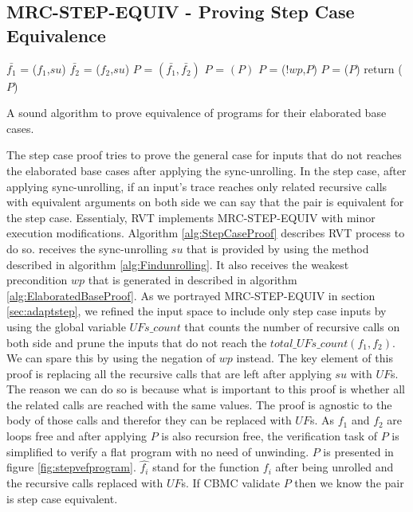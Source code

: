 \subsection{MRC-STEP-EQUIV - Proving Step Case Equivalence}
\label{sec:MRC-STEP-EQUIV}
\noindent
\begin{algorithm}
\begin{minipage}{\linewidth}
\begin{algorithmic}[1]
	\State$\bar{f_1}$ = ($f_1$,$su$)
	\State$\bar{f_2}$ = ($f_2$,$su$)
	\State $P$ = $(\bar{f_1},\bar{f_2})$
	\State $P$ = $(P)$
	\State $P$ = ($!wp$,$P$)
    \State $P$ = ($P$)
    \State return ($P$)
	\EndFunction
\end{algorithmic}
\end{minipage}
\caption{A sound algorithm to prove equivalence of programs for their elaborated base cases.}
\label{alg:StepCaseProof}
\end{algorithm}
The step case proof tries to prove the general case for inputs that do not reaches the elaborated base cases after applying the sync-unrolling. In the step case, after applying sync-unrolling, if an input's trace reaches only related recursive calls with equivalent arguments on both side we can say that the pair is equivalent for the step case. Essentialy, RVT implements MRC-STEP-EQUIV with minor execution modifications. Algorithm \ref{alg:StepCaseProof} describes RVT process to do so.
 receives the sync-unrolling $su$ that is provided by using the method described in algorithm \ref{alg:Findunrolling}. It also receives the weakest precondition $wp$ that is generated in  described in algorithm \ref{alg:ElaboratedBaseProof}. As we portrayed MRC-STEP-EQUIV in section \ref{sec:adaptstep}, we refined the input space to include only step case inputs by using the global variable $UFs\_count$ that counts the number of recursive calls on both side and prune the inputs that do not reach the $total\_UFs\_count(f_1,f_2)$. We can spare this by using the negation of $wp$ instead. The key element of this proof is replacing all the recursive calls that are left after applying $su$ with $UF$s. The reason we can do so is because what is important to this proof is whether all the related calls are reached with the same values. The proof is agnostic to the body of those calls and therefor they can be replaced with $UF$s. As $f_1$ and $f_2$ are loops free and after applying  $P$ is also recursion free, the verification task of $P$ is simplified to verify a flat program with no need of unwinding. $P$ is presented in figure \ref{fig:stepvefprogram}. $\hat{f_i}$ stand for the function $f_i$ after being unrolled and the recursive calls replaced with $UF$s. If CBMC validate $P$ then we know the pair is step case equivalent. 

